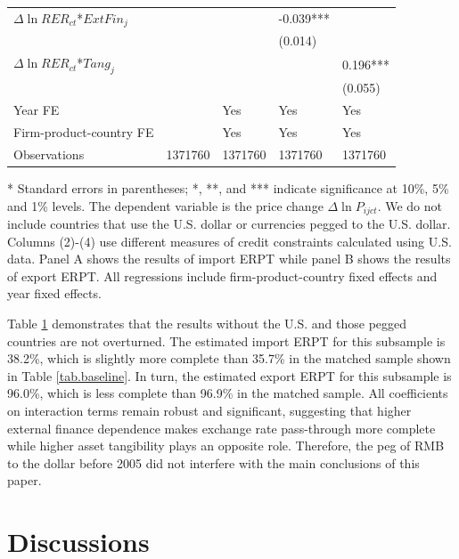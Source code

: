\documentclass[12pt]{article}
\begin{document}
\begin{table}[htbp]
\begin{threeparttable}
\begin{tabular}{lllll}
		$\Delta \ln RER_{ct}$*$ExtFin_{j}$ &       &       & -0.039*** &  \\
		&       &       & (0.014) &  \\
		$\Delta \ln RER_{ct}$*$Tang_{j}$ &       &       &       & 0.196*** \\
		&       &       &       & (0.055) \\
		Year FE  &       & Yes   & Yes   & Yes \\
		Firm-product-country FE &       & Yes   & Yes   & Yes \\
		Observations & 1371760 & 1371760 & 1371760 & 1371760 \\
		\bottomrule
	\end{tabular}
	\begin{tablenotes}
		\footnotesize
		\item[*] Standard errors in parentheses; *, **, and *** indicate significance at 10\%, 5\% and 1\% levels. The dependent variable is the price change $\Delta \ln P_{ijct}$. We do not include countries that use the U.S. dollar or currencies pegged to the U.S. dollar. Columns (2)-(4) use different measures of credit constraints calculated using U.S. data. Panel A shows the results of import ERPT while panel B shows the results of export ERPT. All regressions include firm-product-country fixed effects and year fixed effects.
	\end{tablenotes}
        \end{threeparttable}
        \label{tab.alt.nopeg}
\end{table}

Table \ref{tab.alt.nopeg} demonstrates that the results without the U.S. and those pegged countries are not overturned. The estimated import ERPT for this subsample is 38.2\%, which is slightly more complete than 35.7\% in the matched sample shown in Table \ref{tab.baseline}. In turn, the estimated export ERPT for this subsample is 96.0\%, which is less complete than 96.9\% in the matched sample. All coefficients on interaction terms remain robust and significant, suggesting that higher external finance dependence makes exchange rate pass-through more complete while higher asset tangibility plays an opposite role. Therefore, the peg of RMB to the dollar before 2005 did not interfere with the main conclusions of this paper.

\section{Discussions} \label{Discussions}
\end{document}
